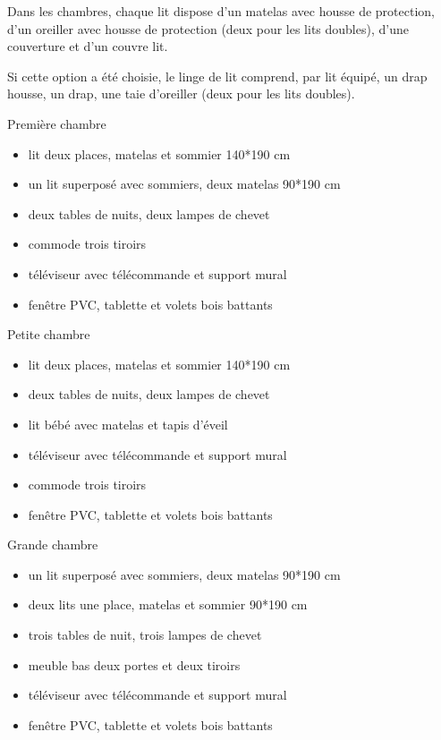 \documentclass[a4paper,11pt]{article}
\begin{document}
Dans les chambres, chaque lit dispose d'un matelas avec housse de protection, d'un oreiller avec housse de protection (deux pour les lits doubles),  d'une couverture et d'un couvre lit.

Si cette option a été choisie, le linge de lit comprend, par lit équipé, un drap housse, un drap, une taie d'oreiller (deux pour les lits doubles).
\vspace{0.5cm}


\vspace{0.25cm}

Première chambre
\begin{itemize}
\item lit deux places, matelas et sommier 140*190 cm
\item un lit superposé avec sommiers, deux matelas 90*190 cm
\item deux tables de nuits, deux lampes de chevet
\item commode trois tiroirs
\item téléviseur avec télécommande et support mural
\item fenêtre PVC, tablette et volets bois battants
\end{itemize}

\vspace{0.5cm}

Petite chambre
\begin{itemize}
\item lit deux places, matelas et sommier 140*190 cm
\item deux tables de nuits, deux lampes de chevet
\item lit bébé avec matelas et tapis d'éveil
\item téléviseur avec télécommande et support mural
\item commode trois tiroirs
\item fenêtre PVC, tablette et volets bois battants
\end{itemize}


\vspace{0.25cm}

Grande chambre
\begin{itemize}
\item un lit superposé avec sommiers, deux matelas 90*190 cm
\item deux lits une place, matelas et sommier 90*190 cm
\item trois tables de nuit, trois lampes de chevet
\item meuble bas deux portes et deux tiroirs
\item téléviseur avec télécommande et support mural
\item fenêtre PVC, tablette et volets bois battants
\end{itemize}
\vspace{0.25cm}
\end{document}

